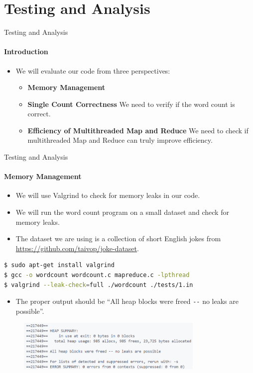 \documentclass[10pt]{beamer}
\begin{document}
\section[3. Testing]{Testing and Analysis}
\begin{frame}{Testing and Analysis}
    \framesubtitle{Introduction}
    \begin{itemize}
        \item We will evaluate our code from three perspectives:
              \begin{itemize}
                  \item \textbf{Memory Management}
                  \item \textbf{Single Count Correctness} We need to verify if the word count is correct.
                  \item \textbf{Efficiency of Multithreaded Map and Reduce} We need to check if multithreaded Map and Reduce can truly improve efficiency.
              \end{itemize}
    \end{itemize}
\end{frame}

\begin{frame}[fragile]{Testing and Analysis}
    \framesubtitle{Memory Management}
    \begin{itemize}
        \item We will use Valgrind to check for memory leaks in our code.
        \item We will run the word count program on a small dataset and check for memory leaks.
        \item The dataset we are using is a collection of short English jokes from \url{https://github.com/taivop/joke-dataset}.
    \end{itemize}
    \begin{lstlisting}[language=bash]
$ sudo apt-get install valgrind
$ gcc -o wordcount wordcount.c mapreduce.c -lpthread
$ valgrind --leak-check=full ./wordcount ./tests/1.in
\end{lstlisting}

    \begin{itemize}
        \item The proper output should be ``All heap blocks were freed \verb|--| no leaks are possible''.
    \end{itemize}
    \begin{figure}
        \centering
        \includegraphics[width=0.8\textwidth]{figures/valgrind_output.png}
    \end{figure}
\end{frame}
\end{document}
